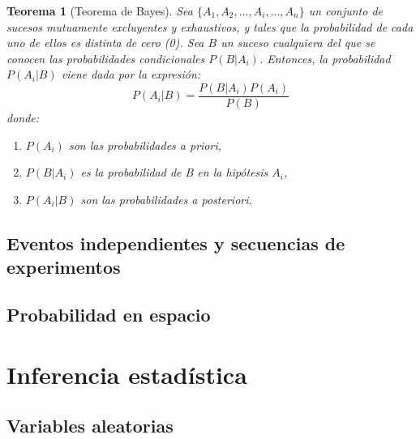 \documentclass[10pt,]{krantz}
\providecommand{\tightlist}{%
  \setlength{\itemsep}{0pt}\setlength{\parskip}{0pt}}
\newtheorem{theorem}{Teorema}[chapter]
\theoremstyle{definition}
\theoremstyle{definition}
\theoremstyle{definition}
\theoremstyle{definition}
\theoremstyle{remark}
\begin{document}
\begin{theorem}[Teorema de Bayes]
\protect\hypertarget{thm:unnamed-chunk-15}{}{\label{thm:unnamed-chunk-15} {} }Sea \(\{A_{1},A_{2},...,A_{i},...,A_{n}\}\) un conjunto de sucesos mutuamente excluyentes y exhaustivos, y tales que la probabilidad de cada uno de ellos es distinta de cero (0). Sea \(B\) un suceso cualquiera del que se conocen las probabilidades condicionales \(P(B|A_i )\). Entonces, la probabilidad \(P(A_i|B)\) viene dada por la expresión:
\[P(A_i|B)=\frac{P(B|A_i)P(A_i)}{P(B)}\]
donde:

\begin{enumerate}
\def\labelenumi{\arabic{enumi}.}
\tightlist
\item
  \(P(A_i)\) son las probabilidades a priori,
\item
  \(P(B|A_i)\) es la probabilidad de B en la hipótesis \(A_i\),
\item
  \(P(A_i|B)\) son las probabilidades a posteriori.
\end{enumerate}
\end{theorem}

\hypertarget{eventos-independientes-y-secuencias-de-experimentos}{%
\chapter{Eventos independientes y secuencias de experimentos}\label{eventos-independientes-y-secuencias-de-experimentos}}

\hypertarget{probabilidad-en-espacio}{%
\chapter{Probabilidad en espacio}\label{probabilidad-en-espacio}}

\hypertarget{part-inferencia-estaduxedstica}{%
\part{Inferencia estadística}\label{part-inferencia-estaduxedstica}}

\hypertarget{variables-aleatorias}{%
\chapter{Variables aleatorias}\label{variables-aleatorias}}
\end{document}
